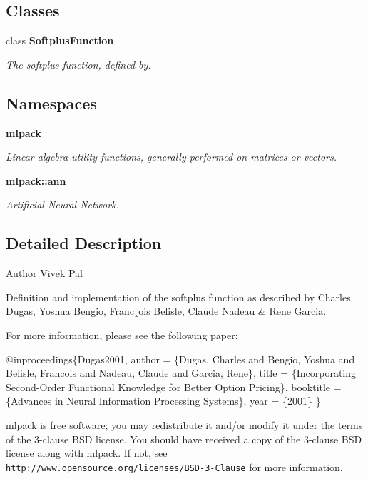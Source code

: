 \subsection*{Classes}
\begin{DoxyCompactItemize}
\item 
class \textbf{ Softplus\+Function}
\begin{DoxyCompactList}\small\item\em The softplus function, defined by. \end{DoxyCompactList}\end{DoxyCompactItemize}
\subsection*{Namespaces}
\begin{DoxyCompactItemize}
\item 
 \textbf{ mlpack}
\begin{DoxyCompactList}\small\item\em Linear algebra utility functions, generally performed on matrices or vectors. \end{DoxyCompactList}\item 
 \textbf{ mlpack\+::ann}
\begin{DoxyCompactList}\small\item\em Artificial Neural Network. \end{DoxyCompactList}\end{DoxyCompactItemize}


\subsection{Detailed Description}
\begin{DoxyAuthor}{Author}
Vivek Pal
\end{DoxyAuthor}
Definition and implementation of the softplus function as described by Charles Dugas, Yoshua Bengio, Franc¸ois Belisle, Claude Nadeau \& Rene Garcia.

For more information, please see the following paper\+:


\begin{DoxyCode}
@inproceedings\{Dugas2001,
  author    = \{Dugas, Charles and Bengio, Yoshua and Belisle, Francois and
               Nadeau, Claude and Garcia, Rene\},
  title     = \{Incorporating Second-Order Functional Knowledge \textcolor{keywordflow}{for} Better
               Option Pricing\},
  booktitle = \{Advances in Neural Information Processing Systems\},
  year      = \{2001\}
\}
\end{DoxyCode}


mlpack is free software; you may redistribute it and/or modify it under the terms of the 3-\/clause B\+SD license. You should have received a copy of the 3-\/clause B\+SD license along with mlpack. If not, see {\tt http\+://www.\+opensource.\+org/licenses/\+B\+S\+D-\/3-\/\+Clause} for more information. 